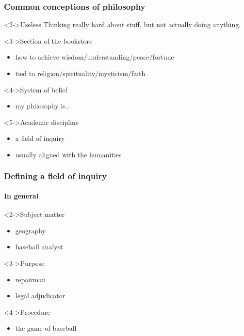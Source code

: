 \documentclass[10pt,letterpaper,xcolor=dvipsnames,handout]{beamer}
\begin{document}
\begin{frame}
\frametitle{Common conceptions of philosophy}

\begin{block}<2->{Useless}
  Thinking really hard about stuff, but not actually doing anything.
\end{block}

\begin{block}<3->{Section of the bookstore}
  \begin{itemize}
    \item how to achieve wisdom/understanding/peace/fortune
    \item tied to religion/spirituality/mysticism/faith
  \end{itemize}
\end{block}

\begin{block}<4->{System of belief}
  \begin{itemize}
    \item my philosophy is...
  \end{itemize}
\end{block}

\begin{block}<5->{Academic discipline}
  \begin{itemize}
    \item a field of inquiry
    \item usually aligned with the humanities
  \end{itemize}
\end{block}

\end{frame}
\begin{frame}
\frametitle{Defining a field of inquiry}
\framesubtitle{In general}

\begin{block}<2->{Subject matter}
  \begin{itemize}
    \item geography
    \item baseball analyst
  \end{itemize}
\end{block}

\begin{block}<3->{Purpose}
  \begin{itemize}
    \item repairman
    \item legal adjudicator
  \end{itemize}
\end{block}

\begin{block}<4->{Procedure}
  \begin{itemize}
    \item the game of baseball
  \end{itemize}
\end{block}

\end{frame}
\end{document}
